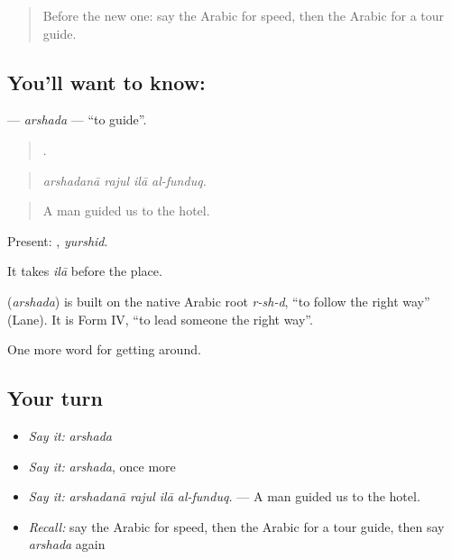 \label{lesson:AR-C437-arshada}



\begin{quote}
Before the new one: say the Arabic for speed, then the Arabic for a tour guide.
\end{quote}

\subsection*{You'll want to know: }
\textbf{} — \emph{arshada} — \textquotedblleft{}to guide\textquotedblright{}.

\begin{quote}
   .
\end{quote}

\begin{quote}
\emph{arshadanā rajul ilā al-funduq.}
\end{quote}

\begin{quote}
A man guided us to the hotel.
\end{quote}

Present: , \emph{yurshid}.

It takes \emph{ilā} before the place.

\begin{cousinweb}
\textbf{} (\emph{arshada}) is built on the native Arabic root \emph{r-sh-d}, \textquotedblleft{}to follow the right way\textquotedblright{} (Lane). It is Form IV, \textquotedblleft{}to lead someone the right way\textquotedblright{}.
\end{cousinweb}

\begin{grammarlens}[title={What you've built}]
One more word for getting around.
\end{grammarlens}

\subsection*{Your turn}
\begin{itemize}
\raggedright
  \item \emph{Say it:} \emph{arshada}
  \item \emph{Say it:} \emph{arshada}, once more
  \item \emph{Say it:} \emph{arshadanā rajul ilā al-funduq.} — A man guided us to the hotel.
  \item \emph{Recall:} say the Arabic for speed, then the Arabic for a tour guide, then say \emph{arshada} again
\end{itemize}

